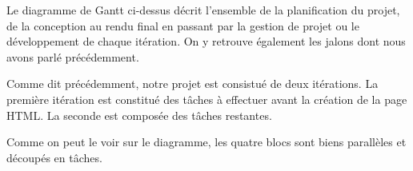 Le diagramme de Gantt ci-dessus décrit l’ensemble de la planification du projet, de la conception au rendu final en passant par la gestion de projet ou le développement de chaque itération. On y retrouve également les jalons dont nous avons parlé précédemment.

Comme dit précédemment, notre projet est consistué de deux itérations. La première itération est constitué des tâches à effectuer avant la création de la page HTML. La seconde est composée des tâches restantes.

Comme on peut le voir sur le diagramme, les quatre blocs sont biens parallèles et découpés en tâches.

















